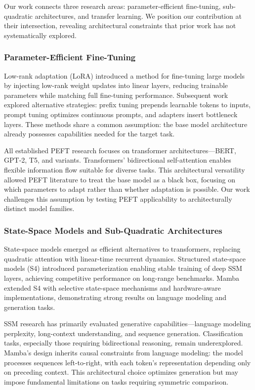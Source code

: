 
Our work connects three research areas: parameter-efficient fine-tuning, sub-quadratic architectures, and transfer learning. We position our contribution at their intersection, revealing architectural constraints that prior work has not systematically explored.

\subsubsection{Parameter-Efficient Fine-Tuning}

Low-rank adaptation (LoRA) introduced a method for fine-tuning large models by injecting low-rank weight updates into linear layers, reducing trainable parameters while matching full fine-tuning performance. Subsequent work explored alternative strategies: prefix tuning prepends learnable tokens to inputs, prompt tuning optimizes continuous prompts, and adapters insert bottleneck layers. These methods share a common assumption: the base model architecture already possesses capabilities needed for the target task.

All established PEFT research focuses on transformer architectures---BERT, GPT-2, T5, and variants. Transformers' bidirectional self-attention enables flexible information flow suitable for diverse tasks. This architectural versatility allowed PEFT literature to treat the base model as a black box, focusing on which parameters to adapt rather than whether adaptation is possible. Our work challenges this assumption by testing PEFT applicability to architecturally distinct model families.

\subsubsection{State-Space Models and Sub-Quadratic Architectures}

State-space models emerged as efficient alternatives to transformers, replacing quadratic attention with linear-time recurrent dynamics. Structured state-space models (S4) introduced parameterization enabling stable training of deep SSM layers, achieving competitive performance on long-range benchmarks. Mamba extended S4 with selective state-space mechanisms and hardware-aware implementations, demonstrating strong results on language modeling and generation tasks.

SSM research has primarily evaluated generative capabilities---language modeling perplexity, long-context understanding, and sequence generation. Classification tasks, especially those requiring bidirectional reasoning, remain underexplored. Mamba's design inherits causal constraints from language modeling: the model processes sequences left-to-right, with each token's representation depending only on preceding context. This architectural choice optimizes generation but may impose fundamental limitations on tasks requiring symmetric comparison.


